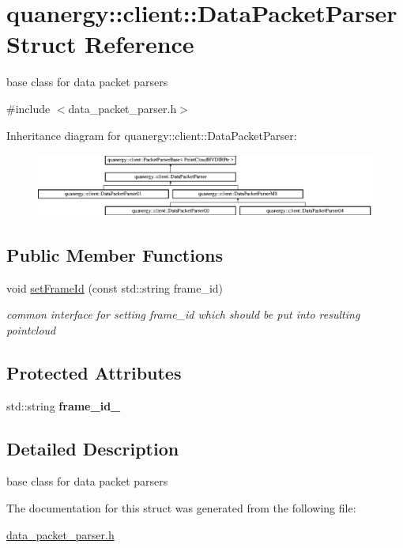 \hypertarget{structquanergy_1_1client_1_1DataPacketParser}{\section{quanergy\-:\-:client\-:\-:Data\-Packet\-Parser Struct Reference}
\label{structquanergy_1_1client_1_1DataPacketParser}
}


base class for data packet parsers  




{\ttfamily \#include $<$data\-\_\-packet\-\_\-parser.\-h$>$}

Inheritance diagram for quanergy\-:\-:client\-:\-:Data\-Packet\-Parser\-:\begin{figure}[H]
\begin{center}
\leavevmode
\includegraphics[height=2.085661cm]{structquanergy_1_1client_1_1DataPacketParser}
\end{center}
\end{figure}
\subsection*{Public Member Functions}
\begin{DoxyCompactItemize}
\item 
\hypertarget{structquanergy_1_1client_1_1DataPacketParser_a4aa6b9daacb64ba0b86c175fcc0a1d2b}{void \hyperlink{structquanergy_1_1client_1_1DataPacketParser_a4aa6b9daacb64ba0b86c175fcc0a1d2b}{set\-Frame\-Id} (const std\-::string frame\-\_\-id)}\label{structquanergy_1_1client_1_1DataPacketParser_a4aa6b9daacb64ba0b86c175fcc0a1d2b}

\begin{DoxyCompactList}\small\item\em common interface for setting frame\-\_\-id which should be put into resulting pointcloud \end{DoxyCompactList}\end{DoxyCompactItemize}
\subsection*{Protected Attributes}
\begin{DoxyCompactItemize}
\item 
\hypertarget{structquanergy_1_1client_1_1DataPacketParser_af52f9f1c410e1aa0adc40e024cece5b8}{std\-::string {\bfseries frame\-\_\-id\-\_\-}}\label{structquanergy_1_1client_1_1DataPacketParser_af52f9f1c410e1aa0adc40e024cece5b8}

\end{DoxyCompactItemize}


\subsection{Detailed Description}
base class for data packet parsers 

The documentation for this struct was generated from the following file\-:\begin{DoxyCompactItemize}
\item 
\hyperlink{data__packet__parser_8h}{data\-\_\-packet\-\_\-parser.\-h}\end{DoxyCompactItemize}
